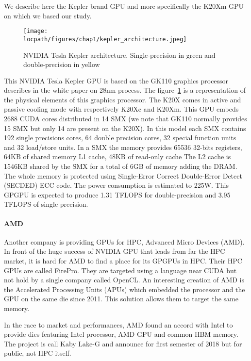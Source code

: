 We describe here the Kepler brand GPU and more specifically the K20Xm GPU on which we based our study. 
\begin{figure}
\centering
\texttt{[image: \\locpath/figures/chap1/kepler\_architecture.jpeg]}
\caption{NVIDIA Tesla Kepler architecture. Single-precision in green and double-precision in yellow}
\label{fig:2_HARD:kepler_arch}
\end{figure}
This NVIDIA Tesla Kepler GPU is based on the GK110 graphics processor describes in the white-paper\cite{nvidia2012nvidias} on 28nm process.
The figure~\ref{fig:2_HARD:kepler_arch} is a representation of the physical elements of this graphics processor. 
The K20X comes in active and passive cooling mode with respectively K20Xc and K20Xm.
This GPU embeds 2688 CUDA cores distributed in 14 SMX (we note that GK110 normally provides 15 SMX but only 14 are present  on the K20X).
In this model each SMX contains 192 single precisions cores, 64 double precision cores, 32 special function units and 32 load/store units.
In a SMX the memory provides 65536 32-bits registers, 64KB of shared memory L1 cache, 48KB of read-only cache
The L2 cache is 1546KB shared by the SMX for a total of 6GB of memory adding the DRAM.
The whole memory is protected using Single‐Error Correct Double‐Error Detect (SECDED) ECC code.
The power consumption is estimated to 225W.
This GPGPU is expected to produce 1.31 TFLOPS for double-precision and 3.95 TFLOPS of single-precision.

\paragraph{AMD}
Another company is providing GPUs for HPC, Advanced Micro Devices (AMD). 
In front of the huge success of NVIDIA GPU that leads from far the HPC market, it is hard for AMD to find a place for its GPGPUs in HPC. 
Their HPC GPUs are called FirePro.
They are targeted using a language near CUDA but not hold by a single company called OpenCL. 
An interesting creation of AMD is the Accelerated Processing Units (APUs) which embedded the processor and the GPU on the same die since 2011. 
This solution allows them to target the same memory. 

In the race to market and performances, AMD found an accord with Intel to provide dies featuring Intel processor, AMD GPU and common HBM memory. 
The project is call  Kaby Lake-G and announce for first semester of 2018 but for public, not HPC itself. 

